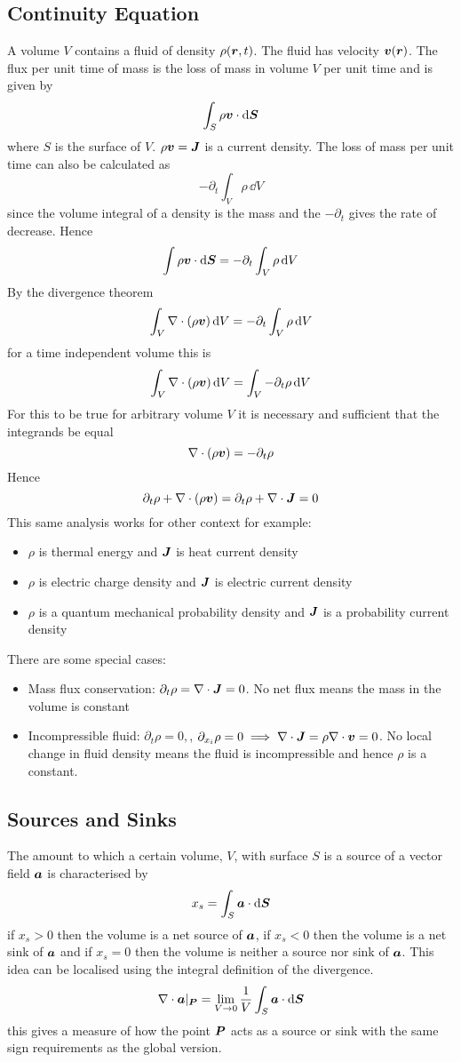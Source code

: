 \documentclass{article}
\newcommand{\pdvx}[1]{\partial_{x_{#1}}}
\begin{document}
    \subsection{Continuity Equation}
    A volume \(V\) contains a fluid of density \(\rho(\bm{r}, t)\).
    The fluid has velocity \(\bm{v}(\bm{r})\).
    The flux per unit time of mass is the loss of mass in volume \(V\) per unit time and is given by
    \[\int_S\rho\bm{v}\cdot\dd\bm{S}\]
    where \(S\) is the surface of \(V\).
    \(\rho\bm{v} = \bm{J}\) is a current density.
    The loss of mass per unit time can also be calculated as
    \[-\partial_t\int_V\rho\,\dd V\]
    since the volume integral of a density is the mass and the \(-\partial_t\) gives the rate of decrease.
    Hence
    \[\int\rho\bm{v}\cdot\dd\bm{S} = -\partial_t\int_V\rho\,\dd V\]
    By the divergence theorem
    \[\int_V\nabla\cdot(\rho\bm{v})\,\dd V = -\partial_t\int_V\rho\,\dd V\]
    for a time independent volume this is
    \[\int_V\nabla\cdot(\rho\bm{v})\,\dd V = \int_V-\partial_t\rho\,\dd V\]
    For this to be true for arbitrary volume \(V\) it is necessary and sufficient that the integrands be equal
    \[\nabla\cdot(\rho\bm{v}) = -\partial_t\rho\]
    Hence
    \[\partial_t\rho + \nabla\cdot(\rho\bm{v}) = \partial_t\rho + \nabla\cdot\bm{J} = 0\]
    This same analysis works for other context for example:
    \begin{itemize}
        \item \(\rho\) is thermal energy and \(\bm{J}\) is heat current density
        \item \(\rho\) is electric charge density and \(\bm{J}\) is electric current density
        \item \(\rho\) is a quantum mechanical probability density and \(\bm{J}\) is a probability current density
    \end{itemize}
    There are some special cases:
    \begin{itemize}
        \item Mass flux conservation: \(\partial_t\rho = \nabla\cdot\bm{J} = 0\).
        No net flux means the mass in the volume is constant
        \item Incompressible fluid: \(\partial_t\rho = 0,\), \(\pdvx i\rho = 0 \implies \div\vv J = \rho\div\vv v = 0\).
        No local change in fluid density means the fluid is incompressible and hence \(\rho\) is a constant.
    \end{itemize}
    
    \subsection{Sources and Sinks}
    The amount to which a certain volume, \(V\), with surface \(S\) is a source of a vector field \(\bm{a}\) is characterised by
    \[x_s = \int_S \bm{a}\cdot\dd\bm{S}\]
    if \(x_s > 0\) then the volume is a net source of \(\bm{a}\),
    if \(x_s < 0\) then the volume is a net sink of \(\bm{a}\) and if \(x_s = 0\) then the volume is neither a source nor sink of \(\bm{a}\).
    This idea can be localised using the integral definition of the divergence.
    \[\nabla\cdot\bm{a}|_{\bm{P}} = \lim_{V\to 0}\frac{1}{V}\int_S\bm{a}\cdot\dd\bm{S}\]
    this gives a measure of how the point \(\bm{P}\) acts as a source or sink with the same sign requirements as the global version.
    
\end{document}
